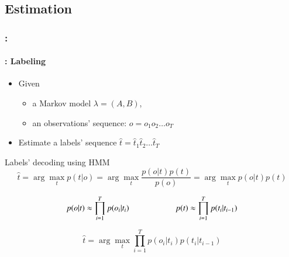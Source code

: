 \documentclass[xcolor=table]{beamer}
\begin{document}
\subsection{Estimation}

\begin{frame}
	\frametitle{\insertshortsubtitle: \insertsection}
	\framesubtitle{\insertsubsection: Labeling}
	
	\begin{itemize}
		\item Given
		\begin{itemize}
			\item a Markov model $\lambda = (A, B)$,
			\item an observations' sequence: $o = o_1 o_2 \ldots o_T$
		\end{itemize}
		\item Estimate a labels' sequence $\hat{t} = \hat{t}_1 \hat{t}_2 \ldots \hat{t}_T$
	\end{itemize}
	
	\begin{block}{Labels' decoding using HMM}
		\[
		\hat{t} = \arg\max\limits_t p(t | o) = \arg\max\limits_t \frac{p(o|t) p(t)}{p(o)} = \arg\max\limits_t p(o|t) p(t)%
		\]
		
		\[ 
		p(o | t) \approx \prod\limits_{i=1}^T p(o_i|t_i) 
		\hskip2cm
		p(t) \approx \prod\limits_{i=1}^T p(t_i|t_{i-1}) 
		\]
		
		\[
		\hat{t} = \arg\max\limits_t \prod\limits_{i=1}^T p(o_i|t_i) p(t_i|t_{i-1})
		\]
	\end{block}
	
\end{frame}
\end{document}
